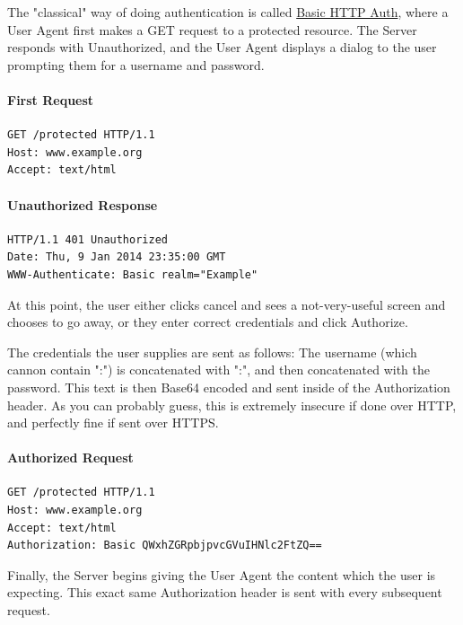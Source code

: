 \documentclass{book}
\begin{document}
The "classical" way of doing authentication is called \href{https://tools.ietf.org/html/rfc2617}{Basic HTTP Auth}, where a User Agent first makes a GET request to a protected resource. The Server responds with Unauthorized, and the User Agent displays a dialog to the user prompting them for a username and password.

\paragraph{\textbf{First Request}}

\begin{verbatim}
GET /protected HTTP/1.1
Host: www.example.org
Accept: text/html
\end{verbatim}

\paragraph{\textbf{Unauthorized Response}}

\begin{verbatim}
HTTP/1.1 401 Unauthorized
Date: Thu, 9 Jan 2014 23:35:00 GMT
WWW-Authenticate: Basic realm="Example"
\end{verbatim}

At this point, the user either clicks cancel and sees a not-very-useful screen and chooses to go away, or they enter correct credentials and click Authorize.

The credentials the user supplies are sent as follows: The username (which cannon contain ":") is concatenated with ":", and then concatenated with the password. This text is then Base64 encoded and sent inside of the Authorization header. As you can probably guess, this is extremely insecure if done over HTTP, and perfectly fine if sent over HTTPS.

\paragraph{\textbf{Authorized Request}}

\begin{verbatim}
GET /protected HTTP/1.1
Host: www.example.org
Accept: text/html
Authorization: Basic QWxhZGRpbjpvcGVuIHNlc2FtZQ==
\end{verbatim}

Finally, the Server begins giving the User Agent the content which the user is expecting. This exact same Authorization header is sent with every subsequent request.
\end{document}
